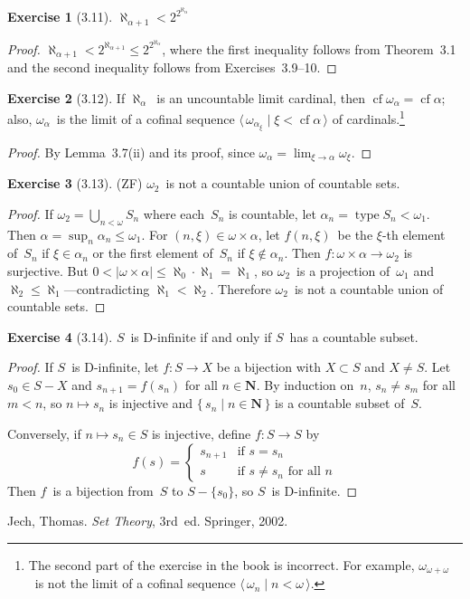 \documentclass[letterpaper,12pt]{article}
\newcommand{\N}{\boldsymbol{N}}
\newcommand{\bigunion}{\bigcup}
\newcommand{\mult}{\cdot}
\DeclareMathOperator{\type}{type}
\DeclareMathOperator{\cf}{cf}
\newcommand{\card}[1]{|#1|}
\newcommand{\seq}[1]{\langle#1\rangle}
\theoremstyle{definition}
\newtheorem*{exer}{Exercise}
\theoremstyle{remark}
\begin{document}
\begin{exer}[3.11]
\(\aleph_{\alpha+1}<2^{2^{\aleph_{\alpha}}}\)
\end{exer}
\begin{proof}
\(\aleph_{\alpha+1}<2^{\aleph_{\alpha+1}}\le 2^{2^{\aleph_{\alpha}}}\), where the first inequality follows from Theorem~3.1 and the second inequality follows from Exercises~3.9--10.
\end{proof}

\begin{exer}[3.12]
If \(\aleph_{\alpha}\)~is an uncountable limit cardinal, then \(\cf\omega_{\alpha}=\cf\alpha\); also, \(\omega_{\alpha}\)~is the limit of a cofinal sequence \(\seq{\,\omega_{\alpha_{\xi}}\mid\xi<\cf\alpha\,}\) of cardinals.\footnote{The second part of the exercise in the book is incorrect. For example, \(\omega_{\omega+\omega}\)~is not the limit of a cofinal sequence \(\seq{\,\omega_n\mid n<\omega\,}\).}
\end{exer}
\begin{proof}
By Lemma~3.7(ii) and its proof, since \(\omega_{\alpha}=\lim_{\xi\to\alpha}\omega_{\xi}\).
\end{proof}

\begin{exer}[3.13]
(ZF) \(\omega_2\)~is not a countable union of countable sets.
\end{exer}
\begin{proof}
If \(\omega_2=\bigunion_{n<\omega} S_n\) where each~\(S_n\) is countable, let \(\alpha_n=\type S_n<\omega_1\). Then \(\alpha=\sup_n\alpha_n\le\omega_1\). For \((n,\xi)\in\omega\times\alpha\), let \(f(n,\xi)\)~be the \(\xi\)-th element of~\(S_n\) if \(\xi\in\alpha_n\) or the first element of~\(S_n\) if \(\xi\not\in\alpha_n\). Then \(f:\omega\times\alpha\to\omega_2\) is surjective. But \(0<\card{\omega\times\alpha}\le\aleph_0\mult\aleph_1=\aleph_1\), so \(\omega_2\)~is a projection of~\(\omega_1\) and \(\aleph_2\le\aleph_1\)---contradicting \(\aleph_1<\aleph_2\). Therefore \(\omega_2\)~is not a countable union of countable sets.
\end{proof}

\begin{exer}[3.14]
\(S\)~is D-infinite if and only if \(S\)~has a countable subset.
\end{exer}
\begin{proof}
If \(S\)~is D-infinite, let \(f:S\to X\) be a bijection with \(X\subset S\) and \(X\ne S\). Let \(s_0\in S-X\) and \(s_{n+1}=f(s_n)\) for all \(n\in\N\). By induction on~\(n\), \(s_n\ne s_m\) for all \(m<n\), so \(n\mapsto s_n\) is injective and \(\{\,s_n\mid n\in\N\,\}\) is a countable subset of~\(S\).

Conversely, if \(n\mapsto s_n\in S\) is injective, define \(f:S\to S\) by
\[f(s)=\begin{cases}
s_{n+1}&\text{if }s=s_n\\
s&\text{if }s\ne s_n\text{ for all }n
\end{cases}\]
Then \(f\)~is a bijection from~\(S\) to \(S-\{s_0\}\), so \(S\)~is D-infinite.
\end{proof}

\begin{thebibliography}{0}
 Jech, Thomas. \textit{Set Theory}, 3rd~ed. Springer, 2002.
\end{thebibliography}
\end{document}
